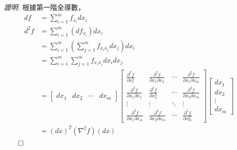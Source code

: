 \documentclass[12pt]{article}
\renewenvironment*{proof}{\textit{證明.}}{\hfill$\qed$}
\begin{document}
    \begin{proof}
        根據第一階全導數，\begin{align*}
            df&=\sum_{i=1}^{m}f_{x_i} dx_i\\
            d^2f&=\sum_{i=1}^{m}(df_{x_i})dx_i\\
            &=\sum_{i=1}^{m}(\sum_{j=1}^{m}f_{x_i x_j}dx_j) dx_i\\
            &=\sum_{i=1}^{m}\sum_{j=1}^{m}f_{x_i x_j}dx_i dx_j\\
            &=\begin{bmatrix}
                dx_1&dx_2&\cdots&dx_m
            \end{bmatrix}\begin{bmatrix}
                \frac{\partial^2 f}{\partial x_1^2}&\frac{\partial^2 f}{\partial x_1 \partial x_2}&\cdots&\frac{\partial^2 f}{\partial x_1 \partial x_m}\\
                \frac{\partial^2 f}{\partial x_1 \partial x_2}&\frac{\partial^2 f}{\partial x_2^2}&\cdots&\frac{\partial^2 f}{\partial x_2 \partial x_m}\\
                \vdots&\vdots&\ddots&\vdots\\
                \frac{\partial^2 f}{\partial x_1 \partial x_m}&\frac{\partial^2 f}{\partial x_2 \partial x_m}&\cdots&\frac{\partial^2 f}{\partial x_m^2}
            \end{bmatrix}\begin{bmatrix}
                dx_1\\dx_2\\\vdots\\dx_m
            \end{bmatrix}\\
            &=(dx)^T(\nabla^2 f)(dx)
        \end{align*}
    \end{proof}
    
\end{document}
